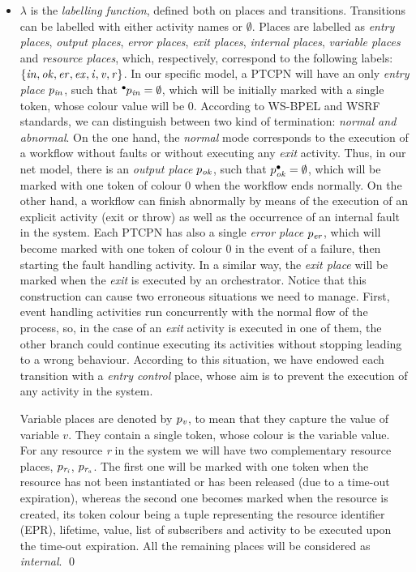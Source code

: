 \begin{definition} 
\begin{itemize}
%
\item $\lambda$ is the {\em labelling function}, defined
both on places and transitions.
%
Transitions can be labelled with either activity names
or $\emptyset$. 
%
Places are labelled as
{\em entry places}, {\em output places}, {\em error places}, {\em exit places}, 
{\em internal places}, {\em variable places} and
{\em resource places},
which, respectively, correspond to the following labels:
$\{{\it in, ok, er, ex, i, v, r}\}$. In our specific model, a 
PTCPN will have an only {\em entry place} $p_{\it in}$, 
such that $\hspace*{-0.4em}~^{\bullet} \hspace*{-0.05em}p_{\it in} = \emptyset$,
which will be
initially marked with a single token, whose colour value will be $0$.
According to WS-BPEL and WSRF standards,
we can distinguish between two kind of termination: \emph{normal and abnormal}. On the one hand, the \emph{normal} mode
corresponds to the execution of a workflow without faults or without executing any \emph{exit} activity. Thus, in our net model, there is 
an {\em output place} $p_{\it ok}$, such that
$p^{\bullet}_{\it ok}=\emptyset$, which will be marked with 
one token of colour $0$ when the workflow ends normally. On the other hand, a workflow can finish abnormally by means of the execution of an explicit activity (exit or throw) as well as
the occurrence of an internal fault in the system. Each PTCPN has also a single {\em error place} $p_{\it er}$, 
which will become marked
with one token of colour $0$ in the event of a failure, then starting the fault handling activity.
In a similar way, the {\em exit place} will be marked when the {\em exit} is executed by an
orchestrator. Notice that this construction 
can cause two erroneous situations we need to manage. First, 
event handling activities run concurrently with the normal flow of the process, so, 
in the case of an {\em exit} activity is executed in one of them, the other branch
could continue executing its activities without stopping leading to a wrong behaviour.
According to this situation, we have endowed each transition
with a {\em entry control} place, whose aim is to prevent the execution of 
any activity in the system. 

Variable places are denoted by $p_{\it v}$, to mean that they 
capture the value of variable $v$. They contain a single token, whose colour is the variable
value.
% 
For any resource {\it r} in the system we will have two 
complementary resource places, $p_{\it r_i}$, $p_{\it r_a}$.
The first one will be marked with one token when the resource
has not been instantiated or has been released (due to a time-out
expiration), whereas the second one  
becomes marked when the resource is created, its token
colour being a tuple representing the resource identifier (EPR),
lifetime, value, %
list of subscribers and activity to be executed upon
the time-out expiration.
All the remaining places will be considered as {\em internal}.
\qed
\end{itemize}
\vspace{-0.5cm}
\end{definition}
